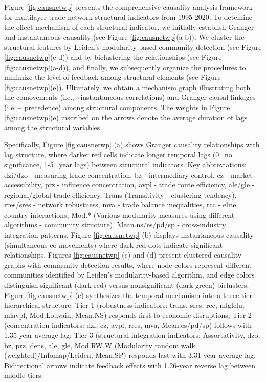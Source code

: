 \documentclass[preprint, 3p,
authoryear]{elsarticle} %
\begin{document}
Figure \ref{fig:causnetwp} presents the comprehensive causality analysis
framework for multilayer trade network structural indicators from
1995-2020. To detemine the effect mechanism of each structural
indicator, we initially establish Granger and instantaneous causality
(see Figure \ref{fig:causnetwp}(a-b)). We cluster the structural
features by Leiden's modularity-based community detection (see Figure
\ref{fig:causnetwp}(c-d)) and by biclustering the relationships (see
Figure \ref{fig:causnetwp}(a-d)), and finally, we subsequently organize
the procedures to minimize the level of feedback among structural
elements (see Figure \ref{fig:causnetwp}(e)). Ultimately, we obtain a
mechanism graph illustrating both the comovements (i.e.,
\textasciitilde instantaneous correlations) and Granger causal linkages
(i.e.,\textasciitilde{} precedence) among structural components. The
weights in Figure \ref{fig:causnetwp}(e) inscribed on the arrows denote
the average duration of lags among the structural variables.

Specifically, Figure \ref{fig:causnetwp} (a) shows Granger causality
relationships with lag structure, where darker red cells indicate longer
temporal lags (0=no significance, 1-5=year lags) between structural
indicators. Key abbreviations: \gls{dzi}/\gls{dzo} - measuring trade
concentration, \gls{bz} - intermediary control, \gls{cz} - market
accessibility, \gls{prz} - influence concentration, \gls{avpl} - trade
route efficiency, \gls{ale}/\gls{gle} - regional/global trade
efficiency, Trans (Transitivity - clustering tendency),
\gls{rres}/\gls{sres} - network robustness, \gls{mva} - trade balance
inequalities, \gls{rcc} - elite country interactions, Mod.* (Various
modularity measures using different algorithms - community structure),
Mean.\gls{ns}/\gls{es}/\gls{pd}/\gls{sp} - cross-industry integration
patterns. Figure \ref{fig:causnetwp} (b) displays instantaneous
causality (simultaneous co-movements) where dark red dots indicate
significant relationships. Figures \ref{fig:causnetwp} (c) and (d)
present clustered causality graphs with community detection results,
where node colors represent different communities identified by Leiden's
modularity-based algorithm, and edge colors distinguish significant
(dark red) versus nonsignificant (dark green) biclusters. Figure
\ref{fig:causnetwp} (e) synthesizes the temporal mechanism into a
three-tier hierarchical structure: Tier 1 (robustness indicators:
\gls{trans}, \gls{sres}, \gls{rcc}, \gls{mlglclu}, \gls{mlavpl},
Mod.Louvain, Mean.NS) responds first to economic disruptions; Tier 2
(concentration indicators: \gls{dzi}, \gls{cz}, \gls{avpl}, \gls{rres},
\gls{mva}, Mean.\gls{es}/\gls{pd}/\gls{sp}) follows with 1.35-year
average lag; Tier 3 (structural integration indicators: Assortativity,
\gls{dzo}, \gls{bz}, \gls{prz}, \gls{dens}, \gls{ale}, \gls{gle},
Mod.RW.W (Modularity random walk (weighted)/Infomap/Leiden, Mean.SP)
responds last with 3.31-year average lag. Bidirectional arrows indicate
feedback effects with 1.26-year reverse lag between middle tiers.
\end{document}
